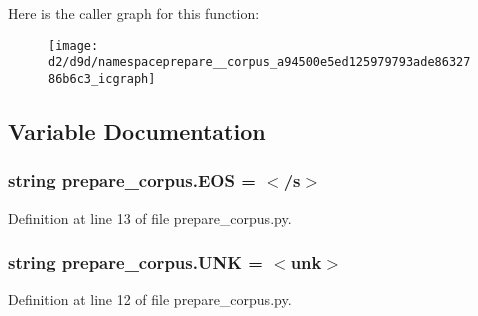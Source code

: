 Here is the caller graph for this function\+:
\nopagebreak
\begin{figure}[H]
\begin{center}
\leavevmode
\texttt{[image: d2/d9d/namespaceprepare\_\_corpus\_a94500e5ed125979793ade8632786b6c3\_icgraph]}
\end{center}
\end{figure}




\subsection{Variable Documentation}
\subsubsection[{\texorpdfstring{E\+OS}{EOS}}]{\setlength{\rightskip}{0pt plus 5cm}string prepare\+\_\+corpus.\+E\+OS = \textquotesingle{}$<$/s$>$\textquotesingle{}}\hypertarget{namespaceprepare__corpus_a0ba757facf41222f76e6596363b348c4}{}\label{namespaceprepare__corpus_a0ba757facf41222f76e6596363b348c4}


Definition at line 13 of file prepare\+\_\+corpus.\+py.

\subsubsection[{\texorpdfstring{U\+NK}{UNK}}]{\setlength{\rightskip}{0pt plus 5cm}string prepare\+\_\+corpus.\+U\+NK = \textquotesingle{}$<$unk$>$\textquotesingle{}}\hypertarget{namespaceprepare__corpus_a3a77493842e1a07de99c534afdef4e4d}{}\label{namespaceprepare__corpus_a3a77493842e1a07de99c534afdef4e4d}


Definition at line 12 of file prepare\+\_\+corpus.\+py.

